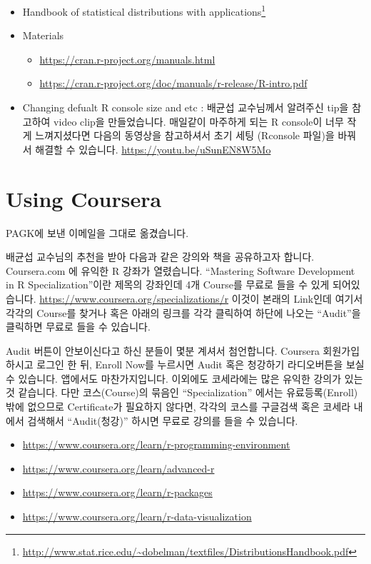 \documentclass[10pt,]{krantz}
\providecommand{\tightlist}{%
  \setlength{\itemsep}{0pt}\setlength{\parskip}{0pt}}
\renewenvironment{quote}{\begin{VF}}{\end{VF}}
\renewcommand{\href}[2]{#2\footnote{\url{#1}}}
\theoremstyle{definition}
\theoremstyle{definition}
\theoremstyle{remark}
\begin{document}
\begin{itemize}
\tightlist
\item
  \href{http://www.stat.rice.edu/~dobelman/textfiles/DistributionsHandbook.pdf}{Handbook
  of statistical distributions with applications}
  \citep{krishnamoorthy2006handbook}
\item
  Materials

  \begin{itemize}
  \tightlist
  \item
    \url{https://cran.r-project.org/manuals.html}
  \item
    \url{https://cran.r-project.org/doc/manuals/r-release/R-intro.pdf}
  \end{itemize}
\item
  Changing defualt R console size and etc : 배균섭 교수님께서 알려주신
  tip을 참고하여 video clip을 만들었습니다. 매일같이 마주하게 되는 R
  console이 너무 작게 느껴지셨다면 다음의 동영상을 참고하셔서 초기 세팅
  (Rconsole 파일)을 바꿔서 해결할 수 있습니다.
  \url{https://youtu.be/uSunEN8W5Mo}
\end{itemize}

\section{Using Coursera}\label{using-coursera}

\begin{quote}
PAGK에 보낸 이메일을 그대로 옮겼습니다.
\end{quote}

배균섭 교수님의 추천을 받아 다음과 같은 강의와 책을 공유하고자 합니다.
Coursera.com 에 유익한 R 강좌가 열렸습니다. ``Mastering Software
Development in R Specialization''이란 제목의 강좌인데 4개 Course를
무료로 들을 수 있게 되어있습니다.
\url{https://www.coursera.org/specializations/r} 이것이 본래의 Link인데
여기서 각각의 Course를 찾거나 혹은 아래의 링크를 각각 클릭하여 하단에
나오는 ``Audit''을 클릭하면 무료로 들을 수 있습니다.

Audit 버튼이 안보이신다고 하신 분들이 몇분 계셔서 첨언합니다. Coursera
회원가입하시고 로그인 한 뒤, Enroll Now를 누르시면 Audit 혹은 청강하기
라디오버튼을 보실 수 있습니다. 앱에서도 마찬가지입니다. 이외에도
코세라에는 많은 유익한 강의가 있는 것 같습니다. 다만 코스(Course)의
묶음인 ``Specialization'' 에서는 유료등록(Enroll) 밖에 없으므로
Certificate가 필요하지 않다면, 각각의 코스를 구글검색 혹은 코세라 내에서
검색해서 ``Audit(청강)'' 하시면 무료로 강의를 들을 수 있습니다.

\begin{itemize}
\tightlist
\item
  \url{https://www.coursera.org/learn/r-programming-environment}
\item
  \url{https://www.coursera.org/learn/advanced-r}
\item
  \url{https://www.coursera.org/learn/r-packages}
\item
  \url{https://www.coursera.org/learn/r-data-visualization}
\end{itemize}
\end{document}
